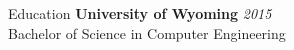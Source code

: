 \documentclass{resume} %
\begin{document}
	
\begin{rSection}{Education}
	{\bf University of Wyoming} \hfill {\em 2015} 
	\\ Bachelor of Science in Computer Engineering
\end{rSection}
\end{document}
